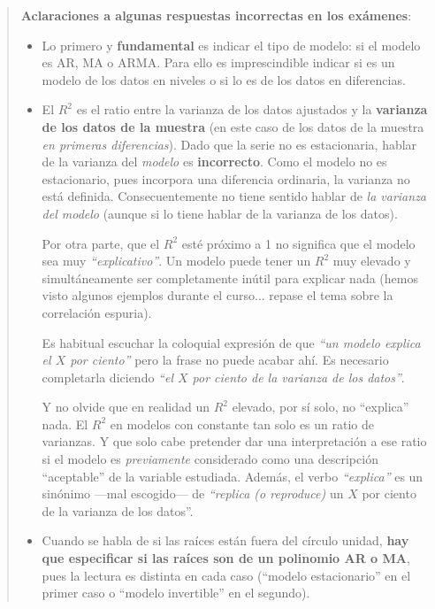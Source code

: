 \documentclass[10pt]{article}
\begin{document}
\begin{quote}
\textbf{Aclaraciones a algunas respuestas incorrectas en los exámenes}:

\begin{itemize}
\item Lo primero y \textbf{fundamental} es indicar el tipo de modelo: si el
modelo es AR, MA o ARMA. Para ello es imprescindible indicar si es
un modelo de los datos en niveles o si lo es de los datos en
diferencias.

\item El \(R^2\) es el ratio entre la varianza de los datos ajustados y la
\textbf{varianza de los datos de la muestra} (en este caso de los datos de
la muestra \emph{en primeras diferencias}). Dado que la serie no es
estacionaria, hablar de la varianza del \emph{modelo} es
\textbf{incorrecto}. Como el modelo no es estacionario, pues incorpora una
diferencia ordinaria, la varianza no está definida. Consecuentemente
no tiene sentido hablar de \emph{la varianza del modelo} (aunque si lo
tiene hablar de la varianza de los datos).

Por otra parte, que el \(R^2\) esté próximo a 1 no significa que el
modelo sea muy \emph{``explicativo''}. Un modelo puede tener un \(R^2\) muy
elevado y simultáneamente ser completamente inútil para explicar
nada (hemos visto algunos ejemplos durante el curso\(\ldots{}\) repase
el tema sobre la correlación espuria).

Es habitual escuchar la coloquial expresión de que \emph{``un modelo
explica el \(X\) por ciento''} pero la frase no puede acabar ahí. Es
necesario completarla diciendo \emph{``el \(X\) por ciento de la varianza
de los datos''}.

Y no olvide que en realidad un \(R^2\) elevado, por sí solo, no
``explica'' nada.  El \(R^2\) en modelos con constante tan solo es un
ratio de varianzas. Y que solo cabe pretender dar una interpretación
a ese ratio si el modelo es \emph{previamente} considerado como una
descripción ``aceptable'' de la variable estudiada. Además, el verbo
\emph{``explica''} es un sinónimo ---mal escogido--- de \emph{``replica (o
reproduce)} un \(X\) por ciento de la varianza de los datos''.

\item Cuando se habla de si las raíces están fuera del círculo unidad,
\textbf{hay que especificar si las raíces son de un polinomio AR o MA},
pues la lectura es distinta en cada caso (``modelo estacionario'' en
el primer caso o ``modelo invertible'' en el segundo).


\end{itemize}
\end{quote}
\end{document}
